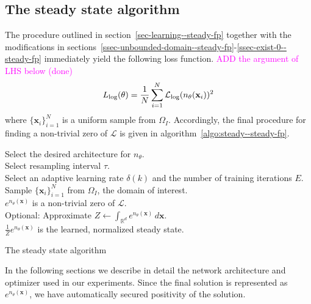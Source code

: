 \subsection{The steady state algorithm}
The procedure outlined in section~\ref{sec-learning--steady-fp} together with the modifications in sections~\ref{ssec-unbounded-domain--steady-fp}-\ref{ssec-exist-0--steady-fp} immediately yield the following loss function. \textcolor{magenta}{ADD the argument of LHS below (done)}
\begin{align}
    L_{\log}(\theta) = \frac{1}{N}\sum_{i=1}^N\mathcal L_{\rm log}(n_\theta(\mathbf x_i))^2\label{eq:def-steady-loss--steady-fp}
\end{align}
where $\{\mathbf x_i\}_{i=1}^N$ is a uniform sample from $\Omega_I$. Accordingly, the final procedure for finding a non-trivial zero of $\mathcal L$ is given in algorithm~\ref{algo:steady--steady-fp}.
\begin{algorithm}[t!]
Select the desired architecture for $n_\theta$.\\
Select resampling interval $\tau$.\\
Select an adaptive learning rate $\delta(k)$ and the number of training iterations $E$. 
Sample $\{\mathbf x_i\}_{i=1}^N$ from $\Omega_I$, the domain of interest.\\
$e^{n_\theta(\mathbf x)}$ is a non-trivial zero of $\mathcal{L}$.\\
Optional: Approximate $Z\leftarrow\int_{\mathbb R^d}e^{n_\theta(\mathbf x)}\,d\mathbf x$.\\
$\frac{1}{Z}e^{n_\theta(\mathbf x)}$ is the learned, normalized steady state.
\caption{The steady state algorithm}
\label{algo:steady--steady-fp}
\end{algorithm}
In the following sections we describe in detail the network architecture and optimizer used in our experiments. Since the final solution is represented as $e^{n_\theta(\mathbf x)}$, we have automatically secured positivity of the solution.


